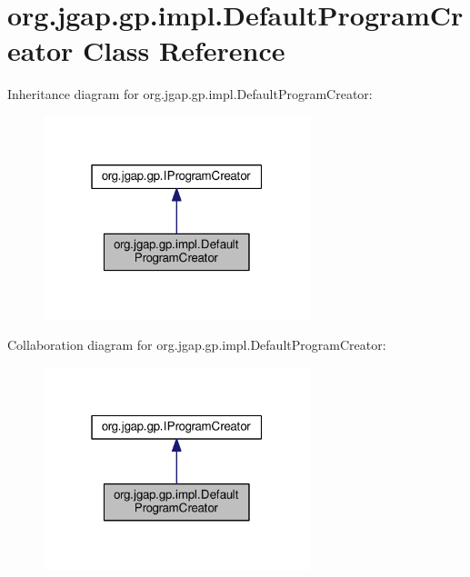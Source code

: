 \hypertarget{classorg_1_1jgap_1_1gp_1_1impl_1_1_default_program_creator}{\section{org.\-jgap.\-gp.\-impl.\-Default\-Program\-Creator Class Reference}
\label{classorg_1_1jgap_1_1gp_1_1impl_1_1_default_program_creator}
}


Inheritance diagram for org.\-jgap.\-gp.\-impl.\-Default\-Program\-Creator\-:
\nopagebreak
\begin{figure}[H]
\begin{center}
\leavevmode
\includegraphics[width=220pt]{classorg_1_1jgap_1_1gp_1_1impl_1_1_default_program_creator__inherit__graph}
\end{center}
\end{figure}


Collaboration diagram for org.\-jgap.\-gp.\-impl.\-Default\-Program\-Creator\-:
\nopagebreak
\begin{figure}[H]
\begin{center}
\leavevmode
\includegraphics[width=220pt]{classorg_1_1jgap_1_1gp_1_1impl_1_1_default_program_creator__coll__graph}
\end{center}
\end{figure}
